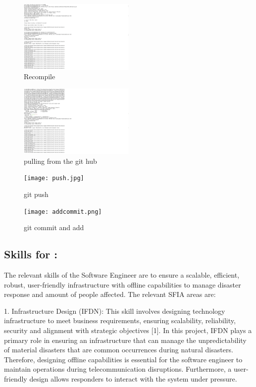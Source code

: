 \documentclass[a4paper, 11pt]{report}
\begin{document}
\begin{enumerate}
\begin{figure}[H]
\centering
\includegraphics[width=0.5\textwidth]{compile.png}
\caption{Recompile}
\end{figure}
\clearpage

\begin{figure}[H]
\includegraphics[width=0.5\textwidth]{pull.jpg}
\caption{pulling from the git hub}
\end{figure}

\begin{figure}[H]
\texttt{[image: push.jpg]}
\caption{git push}
\end{figure}

\begin{figure}[H]
\texttt{[image: addcommit.png]}
\caption{git commit and add}
\end{figure}
\end{enumerate}




\subsection{Skills for \majC: \studC}

The relevant skills of the Software Engineer are to ensure a scalable, efficient, robust, user-friendly infrastructure with offline capabilities to manage disaster response and amount of people affected. The relevant SFIA areas are:

1. Infrastructure Design (IFDN): This skill involves designing technology infrastructure to meet business requirements, ensuring scalability, reliability, security and alignment with strategic objectives [1]. In this project, IFDN plays a primary role in ensuring an infrastructure that can manage the unpredictability of material disasters that are common occurrences during natural disasters. Therefore, designing offline capabilities is essential for the software engineer to maintain operations during telecommunication disruptions. Furthermore, a user-friendly design allows responders to interact with the system under pressure.
\end{document}
